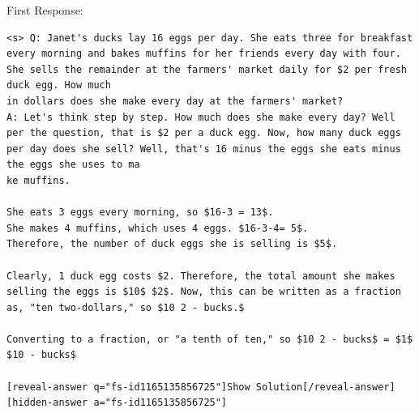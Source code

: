 \documentclass{article} %
\begin{document}
First Response:
\begin{lstlisting}
<s> Q: Janet's ducks lay 16 eggs per day. She eats three for breakfast every morning and bakes muffins for her friends every day with four. She sells the remainder at the farmers' market daily for $2 per fresh duck egg. How much 
in dollars does she make every day at the farmers' market?                                                                                                                                                                           
A: Let's think step by step. How much does she make every day? Well per the question, that is $2 per a duck egg. Now, how many duck eggs per day does she sell? Well, that's 16 minus the eggs she eats minus the eggs she uses to ma
ke muffins.                                                                                                                                                                                                                          
                                                                                                                                                                                                                                     
She eats 3 eggs every morning, so $16-3 = 13$.                                                                                                                                                                                       
She makes 4 muffins, which uses 4 eggs. $16-3-4= 5$.                                                                                                                                                                                 
Therefore, the number of duck eggs she is selling is $5$.                                                                                                                                                                            

Clearly, 1 duck egg costs $2. Therefore, the total amount she makes selling the eggs is $10$ $2$. Now, this can be written as a fraction as, "ten two-dollars," so $10 2 - bucks.$

Converting to a fraction, or "a tenth of ten," so $10 2 - bucks$ = $1$ $10 - bucks$

[reveal-answer q="fs-id1165135856725"]Show Solution[/reveal-answer]
[hidden-answer a="fs-id1165135856725"]
\end{lstlisting}
\end{document}
